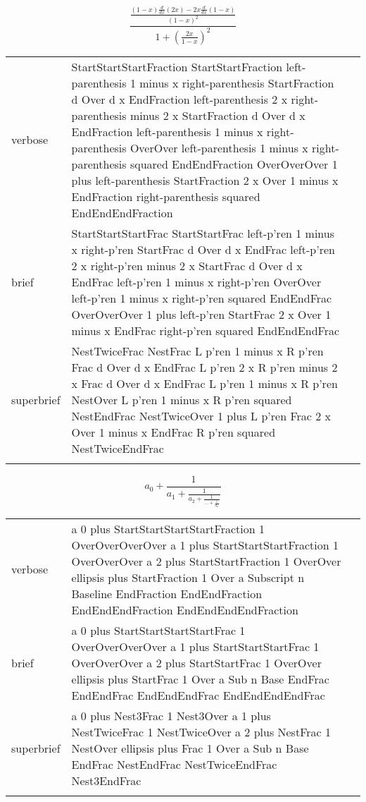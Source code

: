 \R
\E \[\frac{\frac{\left(1-x\right)\frac{d}{dx}\left(2x\right)-2x\frac{d}{dx}\left(1-x\right)}{\left(1-x\right)^2}}{1+\left(\frac{2x}{1-x}\right)^2}\]

\begin{longtable}[c]{@{}lll@{}}
\toprule\addlinespace
verbose & StartStartStartFraction StartStartFraction left-parenthesis 1
minus x right-parenthesis StartFraction d Over d x EndFraction
left-parenthesis 2 x right-parenthesis minus 2 x StartFraction d Over d
x EndFraction left-parenthesis 1 minus x right-parenthesis OverOver
left-parenthesis 1 minus x right-parenthesis squared EndEndFraction
OverOverOver 1 plus left-parenthesis StartFraction 2 x Over 1 minus x
EndFraction right-parenthesis squared EndEndEndFraction &

\\\addlinespace
brief & StartStartStartFrac StartStartFrac left-p'ren 1 minus x
right-p'ren StartFrac d Over d x EndFrac left-p'ren 2 x right-p'ren
minus 2 x StartFrac d Over d x EndFrac left-p'ren 1 minus x right-p'ren
OverOver left-p'ren 1 minus x right-p'ren squared EndEndFrac
OverOverOver 1 plus left-p'ren StartFrac 2 x Over 1 minus x EndFrac
right-p'ren squared EndEndEndFrac &

\\\addlinespace
superbrief & NestTwiceFrac NestFrac L p'ren 1 minus x R p'ren Frac d
Over d x EndFrac L p'ren 2 x R p'ren minus 2 x Frac d Over d x EndFrac L
p'ren 1 minus x R p'ren NestOver L p'ren 1 minus x R p'ren squared
NestEndFrac NestTwiceOver 1 plus L p'ren Frac 2 x Over 1 minus x EndFrac
R p'ren squared NestTwiceEndFrac &

\\\addlinespace
\bottomrule
\end{longtable}



\E \[a_0+\frac{1}{a_1+\frac{1}{a_2+\frac{1}{\ldots + \frac{1}{a_n}}}}\]
\begin{longtable}[c]{@{}lll@{}}
\toprule\addlinespace
verbose & a 0 plus StartStartStartStartFraction 1 OverOverOverOver a 1
plus StartStartStartFraction 1 OverOverOver a 2 plus StartStartFraction
1 OverOver ellipsis plus StartFraction 1 Over a Subscript n Baseline
EndFraction EndEndFraction EndEndEndFraction EndEndEndEndFraction &

\\\addlinespace
brief & a 0 plus StartStartStartStartFrac 1 OverOverOverOver a 1 plus
StartStartStartFrac 1 OverOverOver a 2 plus StartStartFrac 1 OverOver
ellipsis plus StartFrac 1 Over a Sub n Base EndFrac EndEndFrac
EndEndEndFrac EndEndEndEndFrac &

\\\addlinespace
superbrief & a 0 plus Nest3Frac 1 Nest3Over a 1 plus NestTwiceFrac 1
NestTwiceOver a 2 plus NestFrac 1 NestOver ellipsis plus Frac 1 Over a
Sub n Base EndFrac NestEndFrac NestTwiceEndFrac Nest3EndFrac &

\\\addlinespace
\bottomrule
\end{longtable}


